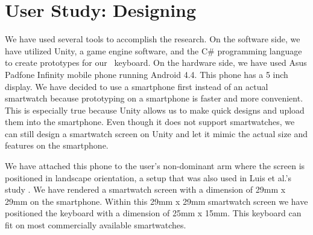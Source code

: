 \section{User Study: Designing \papertitle}
We have used several tools to accomplish the research. On the software side, we have utilized Unity, a game engine software, and the C\# programming language to create prototypes for our \papertitle\ keyboard. On the hardware side, we have used Asus Padfone Infinity mobile phone running Android 4.4. This phone has a 5 inch display. We have decided to use a smartphone first instead of an actual smartwatch because prototyping on a smartphone is faster and more convenient. This is especially true because Unity allows us to make quick designs and upload them into the smartphone. Even though it does not support smartwatches, we can still design a smartwatch screen on Unity and let it mimic the actual size and features on the smartphone.

We have attached this phone to the user’s non-dominant arm where the screen is positioned in landscape orientation, a setup that was also used in Luis et al.’s study \cite{text-entry-on-small-qwerty}. We have rendered a smartwatch screen with a dimension of 29mm x 29mm on the smartphone. Within this 29mm x 29mm smartwatch screen we have positioned the keyboard with a dimension of 25mm x 15mm. This keyboard can fit on most commercially available smartwatches.


